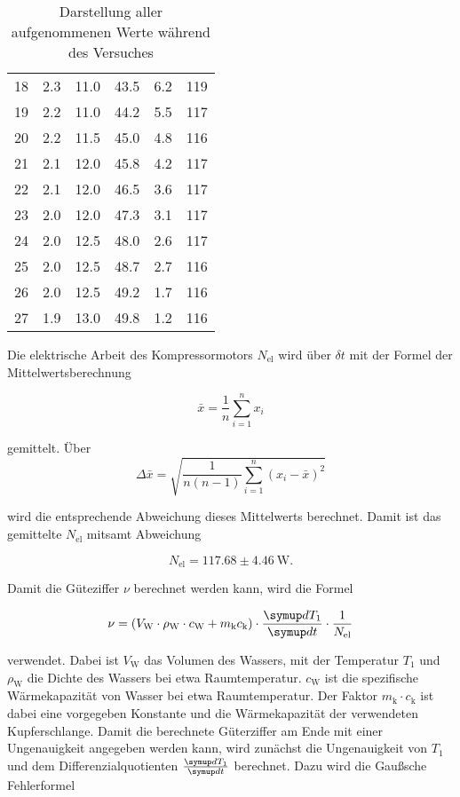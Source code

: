 \begin{table}
\begin{tabular}{S[table-format=2.0] S[table-format=1.1] S[table-format=2.1] S[table-format=2.1] S[table-format=2.1] S[table-format=3.0]}
        18 & 2.3 & 11.0 & 43.5 & 6.2 & 119\\
        19 & 2.2 & 11.0 & 44.2 & 5.5 & 117\\
        20 & 2.2 & 11.5 & 45.0 & 4.8 & 116\\
        21 & 2.1 & 12.0 & 45.8 & 4.2 & 117\\
        22 & 2.1 & 12.0 & 46.5 & 3.6 & 117\\
        23 & 2.0 & 12.0 & 47.3 & 3.1 & 117\\
        24 & 2.0 & 12.5 & 48.0 & 2.6 & 117\\
        25 & 2.0 & 12.5 & 48.7 & 2.7 & 116\\
        26 & 2.0 & 12.5 & 49.2 & 1.7 & 116\\
        27 & 1.9 & 13.0 & 49.8 & 1.2 & 116\\
            \bottomrule
    \end{tabular}
    \caption{Darstellung aller aufgenommenen Werte während des Versuches}
    \label{tab:werte}
\end{table}

Die elektrische Arbeit des Kompressormotors $N_\text{el}$ wird über $\delta t$ mit der Formel der Mittelwertsberechnung

\begin{equation}
    \bar{x} = \frac{1}{n} \sum_{i=1}^n x_i
\end{equation}

gemittelt.
Über 
\begin{equation}
    \Delta\bar{x} = \sqrt{\frac{1}{n(n-1)}\sum_{i=1}^n (x_i - \bar{x})^2}
\end{equation}

wird die entsprechende Abweichung dieses Mittelwerts berechnet. 
Damit ist das gemittelte $N_\text{el}$ mitsamt Abweichung

\begin{equation}
   N_\text{el} = 117.68 \pm \SI{4.46}{\watt}.
\end{equation}

Damit die Güteziffer $\nu$ berechnet werden kann, wird die Formel

\begin{equation}
    \nu = (V_\text{W} \cdot \rho _\text{W} \cdot c_\text{W} + m_\text{k} c_\text{k}) \cdot \frac{\dif{T_1}}{\dif{t}} \cdot \frac{1}{N_\text{el}}
    \label{eq:gueteziffer}
\end{equation}

verwendet. Dabei ist $V_\text{W}$ das Volumen des Wassers, mit der Temperatur $T_1$ und $\rho _\text{W}$ die Dichte des Wassers bei etwa Raumtemperatur. 
$c_\text{W}$ ist die spezifische Wärmekapazität von Wasser bei etwa Raumtemperatur. 
Der Faktor $m_\text{k} \cdot c_\text{k}$ ist dabei eine vorgegeben Konstante und die Wärmekapazität der verwendeten Kupferschlange. Damit die berechnete Güterziffer am Ende mit einer Ungenauigkeit angegeben werden kann, wird zunächst die Ungenauigkeit von $T_1$ und dem Differenzialquotienten $\frac{\dif{T_1}}{\dif{t}}$ berechnet. 
Dazu wird die Gaußsche Fehlerformel

